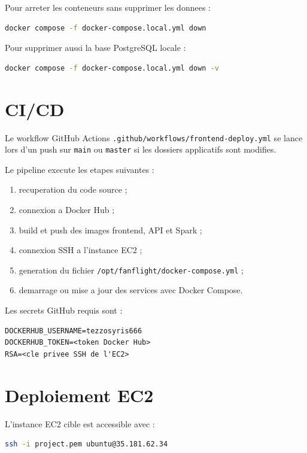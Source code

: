 \documentclass[12pt,a4paper]{article}
\begin{document}
Pour arreter les conteneurs sans supprimer les donnees :

\begin{lstlisting}[language=bash]
docker compose -f docker-compose.local.yml down
\end{lstlisting}

Pour supprimer aussi la base PostgreSQL locale :

\begin{lstlisting}[language=bash]
docker compose -f docker-compose.local.yml down -v
\end{lstlisting}

\section{CI/CD}

Le workflow GitHub Actions \texttt{.github/workflows/frontend-deploy.yml} se lance lors d'un push sur \texttt{main} ou \texttt{master} si les dossiers applicatifs sont modifies.

Le pipeline execute les etapes suivantes :

\begin{enumerate}
  \item recuperation du code source ;
  \item connexion a Docker Hub ;
  \item build et push des images frontend, API et Spark ;
  \item connexion SSH a l'instance EC2 ;
  \item generation du fichier \texttt{/opt/fanflight/docker-compose.yml} ;
  \item demarrage ou mise a jour des services avec Docker Compose.
\end{enumerate}

Les secrets GitHub requis sont :

\begin{lstlisting}
DOCKERHUB_USERNAME=tezzosyris666
DOCKERHUB_TOKEN=<token Docker Hub>
RSA=<cle privee SSH de l'EC2>
\end{lstlisting}

\section{Deploiement EC2}

L'instance EC2 cible est accessible avec :

\begin{lstlisting}[language=bash]
ssh -i project.pem ubuntu@35.181.62.34
\end{lstlisting}
\end{document}
